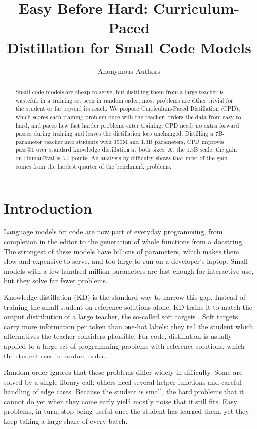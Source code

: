 \documentclass{article} %
\title{Easy Before Hard: Curriculum-Paced \\ Distillation for Small Code Models}
\author{Anonymous Authors}
\begin{document}
\maketitle

\begin{abstract}
Small code models are cheap to serve, but distilling them from a large teacher is wasteful: in a training set seen in random order, most problems are either trivial for the student or far beyond its reach.
We propose Curriculum-Paced Distillation (CPD), which scores each training problem once with the teacher, orders the data from easy to hard, and paces how fast harder problems enter training.
CPD needs no extra forward passes during training and leaves the distillation loss unchanged.
Distilling a 7B-parameter teacher into students with 350M and 1.3B parameters, CPD improves pass@1 over standard knowledge distillation at both sizes.
At the 1.3B scale, the gain on HumanEval is 3.7 points. %
An analysis by difficulty shows that most of the gain comes from the hardest quarter of the benchmark problems.
\end{abstract}

\section{Introduction}
\label{sec:intro}

Language models for code are now part of everyday programming, from completion in the editor to the generation of whole functions from a docstring \citep{chen2021evaluating,roziere2023code}.
The strongest of these models have billions of parameters, which makes them slow and expensive to serve, and too large to run on a developer's laptop.
Small models with a few hundred million parameters are fast enough for interactive use, but they solve far fewer problems.

Knowledge distillation (KD) is the standard way to narrow this gap.
Instead of training the small student on reference solutions alone, KD trains it to match the output distribution of a large teacher, the so-called soft targets \citep{hinton2015distilling}.
Soft targets carry more information per token than one-hot labels: they tell the student which alternatives the teacher considers plausible.
For code, distillation is usually applied to a large set of programming problems with reference solutions, which the student sees in random order.

Random order ignores that these problems differ widely in difficulty.
Some are solved by a single library call; others need several helper functions and careful handling of edge cases.
Because the student is small, the hard problems that it cannot do yet when they come early yield mostly noise that it still fits.
Easy problems, in turn, stop being useful once the student has learned them, yet they keep taking a large share of every batch.
\end{document}
